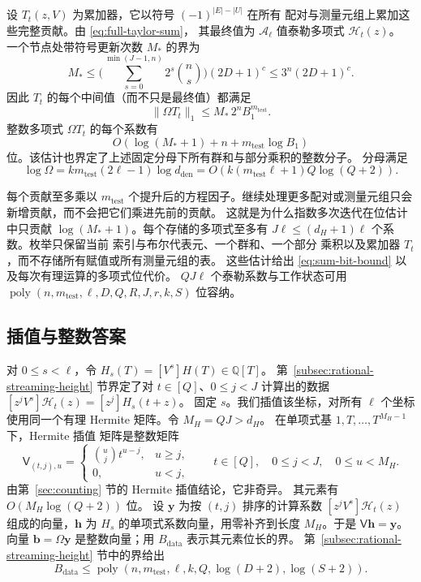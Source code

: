 \documentclass[11pt,reqno]{amsart}
\numberwithin{equation}{section}
\theoremstyle{definition}\newtheorem{definition}[theorem]{定义}
\theoremstyle{remark}\newtheorem{remark}[theorem]{注}
\newcommand{\poly}{\operatorname{poly}}
\renewcommand{\le}{\leqslant}
\renewcommand{\ge}{\geqslant}
\begin{document}
设 $T_t(z,V)$ 为累加器，它以符号 $(-1)^{|E|-|U|}$ 在所有
配对与测量元组上累加这些完整贡献。由 \eqref{eq:full-taylor-sum}，
其最终值为 $\mathcal A_\ell$ 值泰勒多项式 $\mathcal H_t(z)$。
一个节点处带符号更新次数 $M_*$ 的界为
\[
 M_*\le
 \biggl(\sum_{s=0}^{\min(J-1,n)}2^s\binom ns\biggr)(2D+1)^c
 \le3^n(2D+1)^c.
\]
因此 $T_t$ 的每个中间值（而不只是最终值）都满足
\[
 \|\Omega T_t\|_1
 \le M_*\,2^nB_1^{m_{\mathrm{test}}}.
\]
整数多项式 $\Omega T_t$ 的每个系数有
\[
 O\!\left(\log(M_*+1)+n+m_{\mathrm{test}}\log B_1\right)
\]
位。该估计也界定了上述固定分母下所有群和与部分乘积的整数分子。
分母满足
\[
 \log\Omega
 =k m_{\mathrm{test}}(2\ell-1)\log d_{\mathrm{den}}
 =O\!\left(k(m_{\mathrm{test}}\ell+1)Q\log(Q+2)\right).
\]

每个贡献至多乘以 $m_{\mathrm{test}}$ 个提升后的方程因子。继续处理更多配对或测量元组只会新增贡献，而不会把它们乘进先前的贡献。
这就是为什么指数多次迭代在位估计中只贡献
$\log(M_*+1)$。每个存储的多项式至多有
$J\ell\le(d_H+1)\ell$ 个系数。枚举只保留当前
索引与布尔代表元、一个群和、一个部分
乘积以及累加器 $T_t$，而不存储所有赋值或所有测量元组的表。
这些估计给出
\eqref{eq:sum-bit-bound} 以及每次有理运算的多项式位代价。
$QJ\ell$ 个泰勒系数与工作状态可用
$\poly(n,m_{\mathrm{test}},\ell,D,Q,R,J,r,k,S)$ 位容纳。

\subsection{插值与整数答案}
\label{subsec:rational-readout}
对 $0\le s<\ell$，令 $H_s(T)=[V^s]H(T)\in\mathbb Q[T]$。
第~\ref{subsec:rational-streaming-height} 节界定了对
$t\in[Q]$、$0\le j<J$ 计算出的数据
$[z^jV^s]\mathcal H_t(z)=[z^j]H_s(t+z)$。
固定 $s$。我们插值该坐标，对所有 $\ell$ 个坐标使用同一个有理
Hermite 矩阵。令 $M_H=QJ>d_H$。
在单项式基 $1,T,\ldots,T^{M_H-1}$ 下，Hermite 插值
矩阵是整数矩阵
\[
 \mathsf V_{(t,j),u}=
 \begin{cases}\binom uj t^{u-j},&u\ge j,\\0,&u<j,\end{cases}
 \qquad t\in[Q],\quad 0\le j<J,\quad 0\le u<M_H.
\]
由第~\ref{sec:counting} 节的 Hermite 插值结论，它非奇异。
其元素有
$O(M_H\log(Q+2))$ 位。
设 $\mathbf y$ 为按 $(t,j)$ 排序的计算系数
$[z^jV^s]\mathcal H_t(z)$ 组成的向量，$\mathbf h$ 为
$H_s$ 的单项式系数向量，用零补齐到长度
$M_H$。于是 $\mathsf V\mathbf h=\mathbf y$。
向量 $\mathbf b=\Omega\mathbf y$ 是整数向量；用
$B_{\mathrm{data}}$ 表示其元素位长的界。
第~\ref{subsec:rational-streaming-height} 节中的界给出
\[
 B_{\mathrm{data}}
 \le\poly(n,m_{\mathrm{test}},\ell,k,Q,\log(D+2),\log(S+2)).
\]
\end{document}
